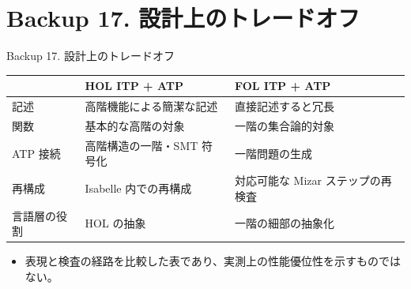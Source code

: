 \documentclass[dvipdfmx,aspectratio=169,11pt]{beamer}
\begin{document}
\section{Backup 17. 設計上のトレードオフ}
\begin{frame}[fragile,t]{Backup 17. 設計上のトレードオフ}
\begin{scriptsize}
\setlength{\tabcolsep}{3pt}
\renewcommand{\arraystretch}{1.15}
\begin{tabularx}{\textwidth}{>{\raggedright\arraybackslash}X>{\raggedright\arraybackslash}X>{\raggedright\arraybackslash}X}
\toprule
\textbf{} & \textbf{HOL ITP + ATP} & \textbf{FOL ITP + ATP} \\
\midrule
記述 & 高階機能による簡潔な記述 & 直接記述すると冗長 \\
関数 & 基本的な高階の対象 & 一階の集合論的対象 \\
ATP 接続 & 高階構造の一階・SMT 符号化 & 一階問題の生成 \\
再構成 & Isabelle 内での再構成 & 対応可能な Mizar ステップの再検査 \\
言語層の役割 & HOL の抽象 & 一階の細部の抽象化 \\
\bottomrule
\end{tabularx}
\end{scriptsize}

\begin{itemize}
\setlength{\itemsep}{1pt}
\setlength{\parsep}{0pt}
\setlength{\parskip}{0pt}
\item 表現と検査の経路を比較した表であり、実測上の性能優位性を示すものではない。
\end{itemize}
\end{frame}
\end{document}
